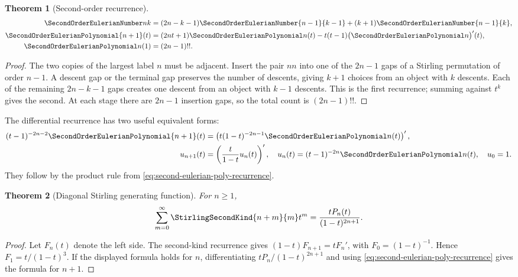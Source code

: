 \documentclass[11pt,a4paper,oneside,openany]{book}
\newtheorem{theorem}{Theorem}[chapter]
\theoremstyle{definition}
\theoremstyle{remark}
\begin{document}
\begin{theorem}[Second-order recurrence]\label{thm:second-eulerian-recurrence}
\begin{align}
 \SecondOrderEulerianNumber nk&=(2n-k-1)\SecondOrderEulerianNumber{n-1}{k-1}
 +(k+1)\SecondOrderEulerianNumber{n-1}{k},
 \label{eq:second-eulerian-recurrence}\\
 \SecondOrderEulerianPolynomial{n+1}(t)&=(2nt+1)\SecondOrderEulerianPolynomial n(t)
 -t(t-1)\bigl(\SecondOrderEulerianPolynomial n\bigr)'(t),
 \label{eq:second-eulerian-poly-recurrence}\\
 \SecondOrderEulerianPolynomial n(1)&=(2n-1)!!.
 \label{eq:second-eulerian-row-sum}
\end{align}
\end{theorem}
\begin{proof}
The two copies of the largest label $n$ must be adjacent.  Insert the pair $nn$
into one of the $2n-1$ gaps of a Stirling permutation of order $n-1$.  A descent
gap or the terminal gap preserves the number of descents, giving $k+1$ choices
from an object with $k$ descents.  Each of the remaining $2n-k-1$ gaps creates one
descent from an object with $k-1$ descents.  This is the first recurrence; summing
against $t^k$ gives the second.  At each stage there are $2n-1$ insertion gaps, so
the total count is $(2n-1)!!$.
\end{proof}

The differential recurrence has two useful equivalent forms:
\begin{align}
 (t-1)^{-2n-2}\SecondOrderEulerianPolynomial{n+1}(t)
 &=\left(t(1-t)^{-2n-1}\SecondOrderEulerianPolynomial n(t)\right)',
 \label{eq:second-eulerian-differential-form}\\
 u_{n+1}(t)&=\left(\frac{t}{1-t}u_n(t)\right)',
 \quad u_n(t)=(t-1)^{-2n}\SecondOrderEulerianPolynomial n(t),\quad u_0=1.
 \label{eq:second-eulerian-u}
\end{align}
They follow by the product rule from
\eqref{eq:second-eulerian-poly-recurrence}.

\begin{theorem}[Diagonal Stirling generating function]\label{thm:second-eulerian-stirling-gf}
For $n\ge1$,
\begin{equation}\label{eq:second-eulerian-stirling-gf}
 \sum_{m=0}^{\infty}\StirlingSecondKind{n+m}{m}t^m
 =\frac{tP_n(t)}{(1-t)^{2n+1}}.
\end{equation}
\end{theorem}
\begin{proof}
Let $F_n(t)$ denote the left side.  The second-kind recurrence gives
$(1-t)F_{n+1}=tF_n'$, with $F_0=(1-t)^{-1}$.  Hence
$F_1=t/(1-t)^3$.  If the displayed formula holds for $n$, differentiating
$tP_n/(1-t)^{2n+1}$ and using
\eqref{eq:second-eulerian-poly-recurrence} gives the formula for $n+1$.
\end{proof}
\end{document}
